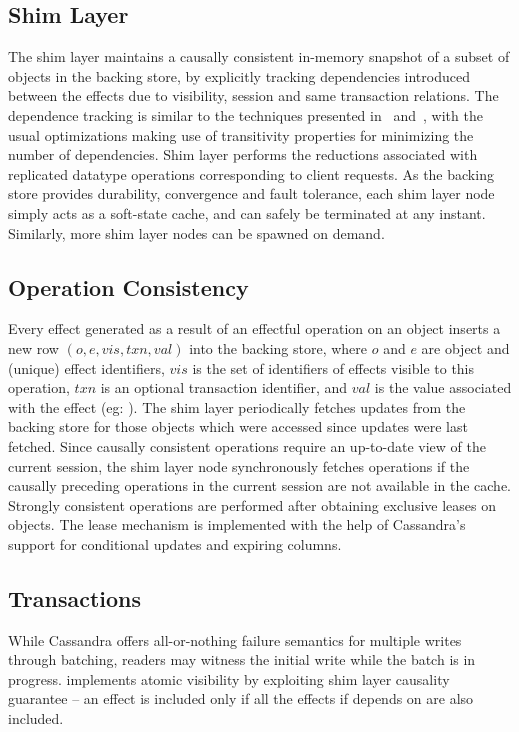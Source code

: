 \subsection{Shim Layer}

The shim layer maintains a causally consistent in-memory snapshot of a subset
of objects in the backing store, by explicitly tracking dependencies introduced
between the effects due to visibility, session and same transaction relations.
The dependence tracking is similar to the techniques presented in~\cite{BoltOn}
and~\cite{Eiger}, with the usual optimizations making use of transitivity
properties for minimizing the number of dependencies. Shim layer performs the
reductions associated with replicated datatype operations corresponding to
client requests. As the backing store provides durability, convergence and
fault tolerance, each shim layer node simply acts as a soft-state cache, and
can safely be terminated at any instant. Similarly, more shim layer nodes can
be spawned on demand.

\subsection{Operation Consistency}

Every effect generated as a result of an effectful operation on an object
inserts a new row $(o,e,vis,txn,val)$ into the backing store, where $o$ and $e$
are object and (unique) effect identifiers, $vis$ is the set of identifiers of
effects visible to this operation, $txn$ is an optional transaction identifier,
and $val$ is the value associated with the effect (eg: ). The
shim layer periodically fetches updates from the backing store for those objects
which were accessed since updates were last fetched. Since causally consistent
operations require an up-to-date view of the current session, the shim layer
node synchronously fetches operations if the causally preceding operations in
the current session are not available in the cache.  Strongly consistent
operations are performed after obtaining exclusive leases on objects. The lease
mechanism is implemented with the help of Cassandra's support for conditional
updates and expiring columns.

\subsection{Transactions}

While Cassandra offers all-or-nothing failure semantics for multiple writes
through batching, readers may witness the initial write while the batch is in
progress. \name implements atomic visibility by exploiting shim layer causality
guarantee -- an effect is included only if all the effects if depends on are
also included.

